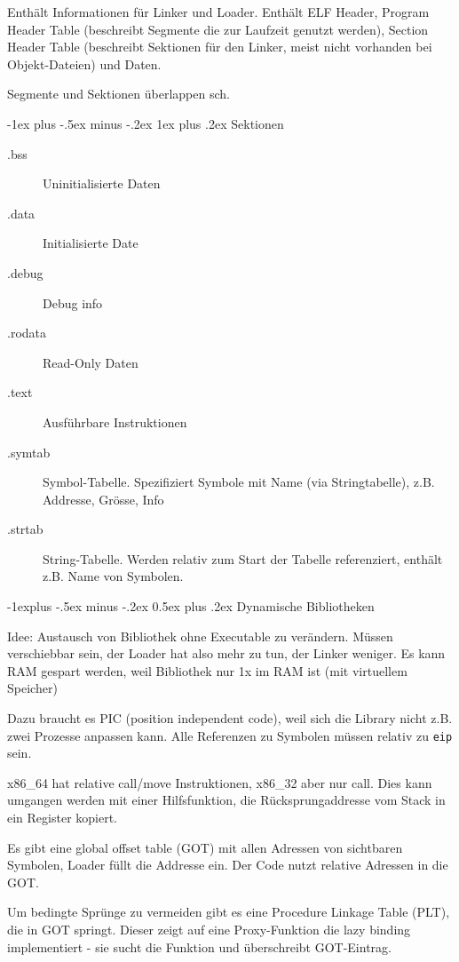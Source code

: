 \documentclass[10pt,landscape,a4paper]{article}
\makeatletter
\renewcommand{\subsection}{\@startsection{subsection}{2}{0mm}%
                                {-1explus -.5ex minus -.2ex}%
                                {0.5ex plus .2ex}%
                                {\normalfont\small\bfseries}}
\renewcommand{\subsubsection}{\@startsection{subsubsection}{3}{0mm}%
                                {-1ex plus -.5ex minus -.2ex}%
                                {1ex plus .2ex}%
                                {\normalfont\footnotesize\bfseries}}
\makeatother
\begin{document}
\begin{multicols*}{3}
Enthält Informationen für Linker und Loader. Enthält ELF Header,
Program Header Table (beschreibt Segmente die zur Laufzeit genutzt werden),
Section Header Table (beschreibt Sektionen für den Linker, meist nicht vorhanden
bei Objekt-Dateien) und Daten.

Segmente und Sektionen überlappen sch.

\subsubsection{Sektionen}

\begin{description}
  \item[.bss] Uninitialisierte Daten
  \item[.data] Initialisierte Date
  \item[.debug] Debug info
  \item[.rodata] Read-Only Daten
  \item[.text] Ausführbare Instruktionen
  \item[.symtab] Symbol-Tabelle. Spezifiziert Symbole mit Name (via
    Stringtabelle), z.B. Addresse, Grösse, Info
  \item[.strtab] String-Tabelle. Werden relativ zum Start der Tabelle
    referenziert, enthält z.B. Name von Symbolen.
\end{description}

\subsection{Dynamische Bibliotheken}

Idee: Austausch von Bibliothek ohne Executable zu verändern. Müssen verschiebbar
sein, der Loader hat also mehr zu tun, der Linker weniger. Es kann RAM gespart
werden, weil Bibliothek nur 1x im RAM ist (mit virtuellem Speicher)

Dazu braucht es PIC (position independent code), weil sich die Library nicht
z.B. zwei Prozesse anpassen kann. Alle Referenzen zu Symbolen müssen relativ zu
\verb|eip| sein.

x86\_64 hat relative call/move Instruktionen, x86\_32 aber nur call. Dies kann
umgangen werden mit einer Hilfsfunktion, die Rücksprungaddresse vom Stack in ein
Register kopiert.

Es gibt eine global offset table (GOT) mit allen Adressen von sichtbaren
Symbolen, Loader füllt die Addresse ein. Der Code nutzt relative Adressen in
die GOT.

Um bedingte Sprünge zu vermeiden gibt es eine Procedure Linkage Table (PLT), die
in GOT springt. Dieser zeigt auf eine Proxy-Funktion die lazy binding
implementiert - sie sucht die Funktion und überschreibt GOT-Eintrag.


\end{multicols*}
\end{document}
